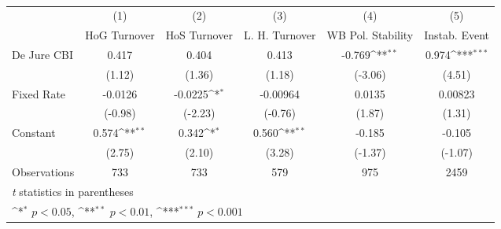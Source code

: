 \begin{table}[htbp]\centering
\def\sym#1{\ifmmode^{#1}\else\(^{#1}\)\fi}
\caption{\label{lkmultIndFEDJ}}
\begin{tabular}{l*{5}{c}}
\toprule
                                        &\multicolumn{1}{c}{(1)}&\multicolumn{1}{c}{(2)}&\multicolumn{1}{c}{(3)}&\multicolumn{1}{c}{(4)}&\multicolumn{1}{c}{(5)}\\
                                        &\multicolumn{1}{c}{HoG Turnover}&\multicolumn{1}{c}{HoS Turnover}&\multicolumn{1}{c}{L. H. Turnover}&\multicolumn{1}{c}{WB Pol. Stability}&\multicolumn{1}{c}{Instab. Event}\\
\midrule
De Jure CBI                             &    0.417         &    0.404         &    0.413         &   -0.769\sym{**} &    0.974\sym{***}\\
                                        &   (1.12)         &   (1.36)         &   (1.18)         &  (-3.06)         &   (4.51)         \\
\addlinespace
Fixed Rate                              &  -0.0126         &  -0.0225\sym{*}  & -0.00964         &   0.0135         &  0.00823         \\
                                        &  (-0.98)         &  (-2.23)         &  (-0.76)         &   (1.87)         &   (1.31)         \\
\addlinespace
Constant                                &    0.574\sym{**} &    0.342\sym{*}  &    0.560\sym{**} &   -0.185         &   -0.105         \\
                                        &   (2.75)         &   (2.10)         &   (3.28)         &  (-1.37)         &  (-1.07)         \\
\midrule
Observations                            &      733         &      733         &      579         &      975         &     2459         \\
\bottomrule
\multicolumn{6}{l}{\footnotesize \textit{t} statistics in parentheses}\\
\multicolumn{6}{l}{\footnotesize \sym{*} \(p<0.05\), \sym{**} \(p<0.01\), \sym{***} \(p<0.001\)}\\
\end{tabular}
\end{table}
